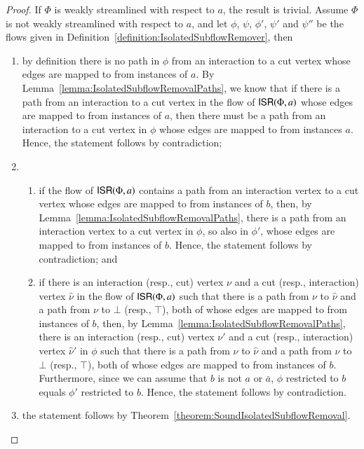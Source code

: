 \begin{proof}
If $\Phi$ is weakly streamlined with respect to $a$, the result is trivial. Assume $\Phi$ is not weakly streamlined with respect to $a$, and let $\phi$, $\psi$, $\phi'$, $\psi'$ and $\psi''$ be the flows given in Definition~\vref{definition:IsolatedSubflowRemover}, then
\begin{enumerate}
\item by definition there is no path in $\phi$ from an interaction to a cut vertex whose edges are mapped to from instances of $a$. By Lemma~\vref{lemma:IsolatedSubflowRemovalPaths}, we know that if there is a path from an interaction to a cut vertex in the flow of $\mathsf{ISR}(\Phi,a)$ whose edges are mapped to from instances of $a$, then there must be a path from an interaction to a cut vertex in $\phi$ whose edges are mapped to from instances $a$. Hence, the statement follows by contradiction;
\item
\begin{enumerate}
 \item if the flow of $\mathsf{ISR}(\Phi,a)$ contains a path from an interaction vertex to a cut vertex whose edges are mapped to from instances of $b$, then, by Lemma~\vref{lemma:IsolatedSubflowRemovalPaths}, there is a path from an interaction vertex to a cut vertex in $\phi$, so also in $\phi'$, whose edges are mapped to from instances of $b$. Hence, the statement follows by contradiction; and
 \item if there is an interaction (resp., cut) vertex $\nu$ and a cut (resp., interaction) vertex $\hat\nu$ in the flow of $\mathsf{ISR}(\Phi,a)$ such that there is a path from $\nu$ to $\hat\nu$ and a path from $\nu$ to $\bot$ (resp., $\top$), both of whose edges are mapped to from instances of $b$, then, by Lemma~\vref{lemma:IsolatedSubflowRemovalPaths}, there is an interaction (resp., cut) vertex $\nu'$ and a cut (resp., interaction) vertex $\hat\nu'$ in $\phi$ such that there is a path from $\nu$ to $\hat\nu$ and a path from $\nu$ to $\bot$ (resp., $\top$), both of whose edges are mapped to from instances of $b$. Furthermore, since we can assume that $b$ is not $a$ or $\bar a$, $\phi$ restricted to $b$ equals $\phi'$ restricted to $b$. Hence, the statement follows by contradiction.
\end{enumerate}
\item the statement follows by Theorem~\vref{theorem:SoundIsolatedSubflowRemoval}.
\end{enumerate}
\end{proof}

